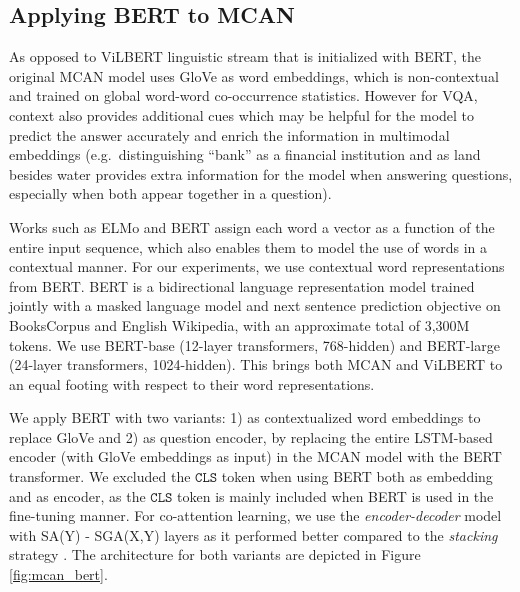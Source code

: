 \documentclass{article}
\begin{document}
\subsection{Applying BERT to MCAN}
As opposed to ViLBERT linguistic stream that is initialized with BERT, the original MCAN model uses GloVe as word embeddings, which is non-contextual and trained on global word-word co-occurrence statistics. However for VQA, context also provides additional cues which may be helpful for the model to predict the answer accurately and enrich the information in multimodal embeddings (e.g.\ distinguishing ``bank'' as a financial institution and as land besides water provides extra information for the model when answering questions, especially when both appear together in a question). 

Works such as ELMo \citep{peters2018elmo} and BERT \citep{devlin-etal-2019-bert} assign each word a vector as a function of the entire input sequence, which also enables them to model the use of words in a contextual manner. For our experiments, we use contextual word representations from BERT. BERT is a bidirectional language representation model trained jointly with a masked language model and next sentence prediction objective on BooksCorpus \citep{bookscorpus} and English Wikipedia, with an approximate total of 3,300M tokens. We use BERT-base (12-layer transformers, 768-hidden) and BERT-large (24-layer transformers, 1024-hidden). This brings both MCAN and ViLBERT to an equal footing with respect to their word representations.

We apply BERT with two variants: 1) as contextualized word embeddings to replace GloVe and 2) as question encoder, by replacing the entire LSTM-based encoder (with GloVe embeddings as input) in the MCAN model with the BERT transformer. We excluded the $\mathtt{CLS}$ token when using BERT both as embedding and as encoder, as the $\mathtt{CLS}$ token is mainly included when BERT is used in the fine-tuning manner. For co-attention learning, we use the \textit{encoder-decoder} model with SA(Y) - SGA(X,Y) layers as it performed better compared to the \textit{stacking} strategy \citep{yu2019mcan}. The architecture for both variants are depicted in Figure \ref{fig:mcan_bert}.
\end{document}
